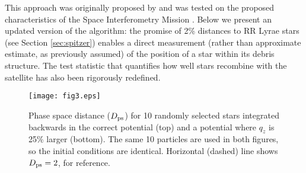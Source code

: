 \documentclass{emulateapj}
\begin{document}
This approach was originally proposed by \citet{johnston99a} and was tested on the proposed characteristics of the Space
Interferometry Mission \citep{unwin08}. Below we present an updated version of the algorithm:
the promise of 2\% distances to RR Lyrae stars (see Section
\ref{sec:spitzer}) enables a direct measurement (rather than
approximate estimate, as previously assumed) of the position of a star within its debris
structure. The test statistic that quantifies how well stars recombine
with the satellite has also been rigorously redefined.

\begin{figure}[h]
\begin{center}
\texttt{[image: fig3.eps]}
\caption{Phase space distance ($D_{\rm ps}$) for 10 randomly selected stars integrated backwards in the correct potential (top) and a potential where $q_z$ is 25\% larger (bottom). The same 10 particles are used in both figures, so the initial conditions are identical. Horizontal (dashed) line shows $D_{\rm ps}=2$, for reference.}\label{fig:ps_distance}
\end{center}
\end{figure}
\end{document}
